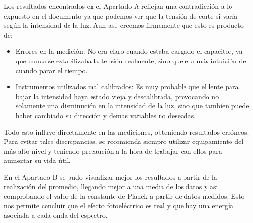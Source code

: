 \documentclass[a4paper,12pt]{report}
\begin{document}
    Los resultados encontrados en el Apartado A reflejan una contradicción a lo expuesto en el documento ya que podemos
  ver que la tensión de corte si varía según la intensidad de la luz. Aun asi, creemos firmemente que esto es producto 
  de:
    \begin{itemize}
      \item Errores en la medición: No era claro cuando estaba cargado el capacitor, ya que nunca se estabilizaba la
      tensión realmente, sino que era más intuición de cuando parar el tiempo.
      \item Instrumentos utilizados mal calibrados: Es muy probable que el lente para bajar la intensidad haya estado
      vieja y descalibrada, provocando no solamente una disminución en la intensidad de la luz, sino que tambien
      puede haber cambiado su dirección y demas variables no deseadas.
    \end{itemize}
  Todo esto influye directamente en las mediciones, obteniendo resultados erróneos. Para evitar tales discrepancias,
  se recomienda siempre utilizar equipamiento del más alto nivel y teniendo precaución a la hora de trabajar con ellos
  para aumentar su vida útil.

  En el Apartado B se pudo visualizar mejor los resultados a partir de la realización del promedio, llegando mejor
  a una media de los datos y asi comprobando el valor de la constante de Planck a partir de datos medidos. Esto nos
  permite concluir que el efecto fotoeléctrico es real y que hay una energía asociada a cada onda del espectro.
\end{document}
